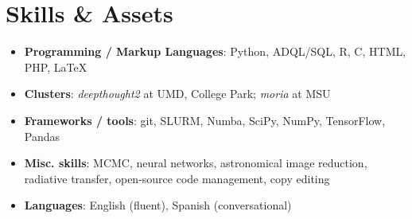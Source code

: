 \documentclass[letterpaper,10.5pt]{article}
\newcommand{\resumeSubHeadingListStart}{\begin{itemize}[leftmargin=*]}
\newcommand{\resumeSubHeadingListEnd}{\end{itemize}}
\newcommand{\shorterSection}[1]{\vspace{-10pt}\section{#1}}
\begin{document}
\shorterSection{Skills \& Assets}
  \resumeSubHeadingListStart
  \small
    \item{
     \textbf{Programming / Markup Languages}{: Python, ADQL/SQL, R, C, HTML, PHP, \LaTeX}
    }
    \vspace{-5pt}
    \item{
     \textbf{Clusters}{: \textit{deepthought2} at UMD, College Park; \textit{moria} at MSU}
    }
    \vspace{-5pt}
    \item{
     \textbf{Frameworks / tools}{: git, SLURM, Numba, SciPy, NumPy, TensorFlow, Pandas}
    }
    \vspace{-5pt}
    \item{
     \textbf{Misc. skills}{: MCMC, neural networks, astronomical image reduction, radiative transfer, open-source code management, copy editing}
    }
    \vspace{-5pt}
    \item{
     \textbf{Languages}{: English (fluent), Spanish (conversational)}
    }
\resumeSubHeadingListEnd
\end{document}
